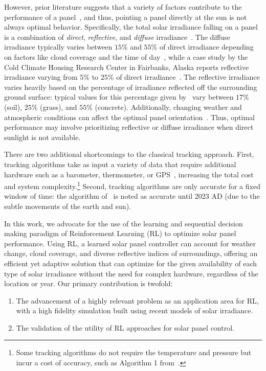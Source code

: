 \documentclass{article}
\begin{document}
However, prior literature suggests that a variety of factors contribute to the performance of a panel~\cite{King2001}, and thus, pointing a panel directly at the sun is not always optimal behavior. Specifically, the total solar irradiance falling on a panel is a combination of {\it direct}, {\it reflective}, and {\it diffuse} irradiance~\cite{Benghanem2011}. The diffuse irradiance typically varies between $15\%$ and $55\%$ of direct irradiance depending on factors like cloud coverage and the time of day~\cite{peterson1981ratio}, while a case study by the Cold Climate Housing Research Center in Fairbanks, Alaska reports reflective irradiance varying from $5\%$ to $25\%$ of direct irradiance~\cite{colgan2010}. The reflective irradiance varies heavily based on the percentage of irradiance reflected off the surrounding ground surface: typical values for this percentage given by~\citet{mcevoy2003practical} vary between $17\%$ (soil), $25\%$ (grass), and $55\%$ (concrete). Additionally, changing weather and atmospheric conditions can affect the optimal panel orientation~\cite{Kelly2009}. Thus, optimal performance may involve prioritizing reflective or diffuse irradiance when direct sunlight is not available.

There are two additional shortcomings to the classical tracking approach. First, tracking algorithms take as input a variety of data that require additional hardware such as a barometer, thermometer, or GPS~\cite{Grena2012}, increasing the total cost and system complexity.\footnote{Some tracking algorithms do not require the temperature and pressure but incur a cost of accuracy, such as Algorithm 1 from~\citet{Grena2012}.} Second, tracking algorithms are only accurate for a fixed window of time: the algorithm of~\citet{Grena2008} is noted as accurate until 2023 AD (due to the subtle movements of the earth and sun).

In this work, we advocate for the use of the learning and sequential decision making paradigm of Reinforcement Learning (RL) to optimize solar panel performance. Using RL, a learned solar panel controller can account for weather change, cloud coverage, and diverse reflective indices of surroundings, offering an efficient yet adaptive solution that can optimize for the given availability of each type of solar irradiance without the need for complex hardware, regardless of the location or year. Our primary contribution is twofold:
\begin{enumerate}
\item The advancement of a highly relevant problem as an application area for RL, with a high fidelity simulation built using recent models of solar irradiance.
\item The validation of the utility of RL approaches for solar panel control.
\end{enumerate}
\end{document}
